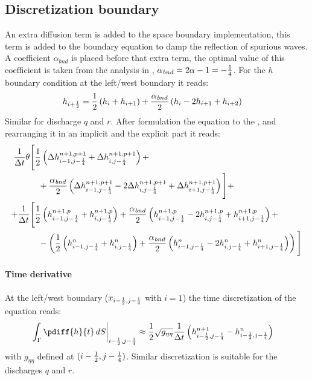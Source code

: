 \subsection{Discretization boundary}
An extra diffusion term is added to the space boundary implementation, this term is added to the boundary equation to damp the reflection of spurious waves.
A coefficient $\alpha_{\mathit bnd}$ is placed before that extra term, the optimal value of this coefficient is taken from the analysis in \citet{transpeq-analysisdiscretizationinsidedomain_boundaries.mw}, $\alpha_{\mathit bnd} = 2 \alpha -1 = -\frac{1}{4}$.
%
For the $h$ boundary condition at the left/west boundary it reads:
\begin{align}
    h_{i+\frac{1}{2}} & = \frac{1}{2} \left( h_{i} +  h_{i+1} \right) +
    \frac{\alpha_{\mathit bnd}}{2} \left( h_{i}
    - 2 h_{i+1} + h_{i+2} \right)
\end{align}
Similar for discharge $q$ and $r$.
After formulation the equation to the \deltaformulation, and rearranging it in an implicit and the explicit part it reads:
\begin{align}
     \frac{1}{\Delta t}  \theta &\Bigg[ \frac{1}{2} \left( \Delta h^{n+1, p+1}_{i-1, j-\frac{1}{4}} + \Delta h^{n+1, p+1}_{i, j-\frac{1}{4}} \right) +
    \nonumber \\*
    & \quad + \frac{\alpha_{\mathit bnd}}{2} \left( \Delta h^{n+1,p+1}_{i-1, j-\frac{1}{4}} - 2 \Delta h^{n+1,p+1}_{i, j-\frac{1}{4}} + \Delta h^{n+1,p+1}_{i+1, j-\frac{1}{4}} \right) \Bigg] +
    \nonumber \\
    + \frac{1}{\Delta t} & \Bigg[ \frac{1}{2} \left( h^{n+1, p}_{i-1, j-\frac{1}{4}} + h^{n+1, p}_{i, j-\frac{1}{4}} \right)
    + \frac{\alpha_{\mathit bnd}}{2}\left(  h^{n+1,p}_{i-1, j-\frac{1}{4}} - 2 h^{n+1,p}_{i, j-\frac{1}{4}}  + h^{n+1,p}_{i+1, j-\frac{1}{4}} \right) +
    \nonumber \\*
    &
    \quad  - \left( \frac{1}{2} \left( h^{n}_{i-1, j-\frac{1}{4}} + h^{n}_{i, j-\frac{1}{4}} \right)
    + \frac{\alpha_{\mathit bnd}}{2}  \left( h^{n}_{i-1, j-\frac{1}{4}} - 2 h^{n}_{i, j-\frac{1}{4}} + h^{n}_{i+1, j-\frac{1}{4}}  \right) \right) \Bigg]
\end{align}

\paragraph*{Time derivative}
At the left/west boundary ($x_{i-\frac{1}{2}, j-\frac{1}{4}}$ with $i=1$) the time discretization of the equation reads:
\begin{align}
    \left.\int_\Gamma\pdiff{h}{t}\, dS \right|_{i-\half, j-\quart} & \approx  \half \sqrt{g_{\eta\eta}} \frac{1}{\Dt}   \left(  h^{n+1}_{i-\half, j-\quart} - h^{n}_{i-\half, j-\quart} \right)
\end{align}
with $g_{\eta\eta}$ defined at $(i-\frac{1}{2}, j-\frac{1}{4})$.
Similar discretization is suitable for the discharges $q$ and $r$.

